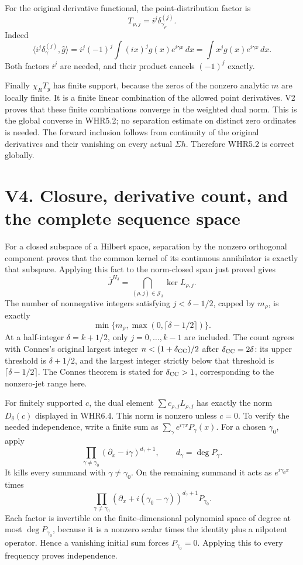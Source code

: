 For the original derivative functional, the point-distribution factor is
\[
T_{\rho,j}=i^j\delta_{\gamma_\rho}^{(j)}.
\] Indeed \[
\langle i^j\delta_{\gamma}^{(j)},\widehat g\rangle
=i^j(-1)^j\int (ix)^jg(x)e^{i\gamma x}\,dx
=\int x^jg(x)e^{i\gamma x}\,dx.
\] Both factors \(i^j\) are needed, and their product cancels \((-1)^j\)
exactly.

Finally \(\chi_RT_y\) has finite support, because the zeros of the
nonzero analytic \(m\) are locally finite. It is a finite linear
combination of the allowed point derivatives. V2 proves that these
finite combinations converge in the weighted dual norm. This is the
global converse in WHR5.2; no separation estimate on distinct zero
ordinates is needed. The forward inclusion follows from continuity of
the original derivatives and their vanishing on every actual
\(\Sigma h\). Therefore WHR5.2 is correct globally.

\section{V4. Closure, derivative count, and the complete sequence
space}\label{v4.-closure-derivative-count-and-the-complete-sequence-space}

For a closed subspace of a Hilbert space, separation by the nonzero
orthogonal component proves that the common kernel of its continuous
annihilator is exactly that subspace. Applying this fact to the
norm-closed span just proved gives \[
\overline J^{H_\delta}
=\bigcap_{(\rho,j)\in\mathscr J_\delta}\ker L_{\rho,j}.
\] The number of nonnegative integers satisfying \(j<\delta-1/2\),
capped by \(m_\rho\), is exactly \[
\min\{m_\rho,\max(0,\lceil\delta-1/2\rceil)\}.
\] At a half-integer \(\delta=k+1/2\), only \(j=0,\ldots,k-1\) are
included. The count agrees with Connes's original largest integer
\(n<(1+\delta_{\rm CC})/2\) after \(\delta_{\rm CC}=2\delta\): its upper
threshold is \(\delta+1/2\), and the largest integer strictly below that
threshold is \(\lceil\delta-1/2\rceil\). The Connes theorem is stated
for \(\delta_{\rm CC}>1\), corresponding to the nonzero-jet range here.

For finitely supported \(c\), the dual element
\(\sum c_{\rho,j}L_{\rho,j}\) has exactly the norm \(D_\delta(c)\)
displayed in WHR6.4. This norm is nonzero unless \(c=0\). To verify the
needed independence, write a finite sum as
\(\sum_\gamma e^{i\gamma x}P_\gamma(x)\). For a chosen \(\gamma_0\),
apply \[
\prod_{\gamma\ne\gamma_0}(\partial_x-i\gamma)^{d_\gamma+1},
\qquad d_\gamma=\deg P_\gamma.
\] It kills every summand with \(\gamma\ne\gamma_0\). On the remaining
summand it acts as \(e^{i\gamma_0x}\) times \[
\prod_{\gamma\ne\gamma_0}
(\partial_x+i(\gamma_0-\gamma))^{d_\gamma+1}P_{\gamma_0}.
\] Each factor is invertible on the finite-dimensional polynomial space
of degree at most \(\deg P_{\gamma_0}\), because it is a nonzero scalar
times the identity plus a nilpotent operator. Hence a vanishing initial
sum forces \(P_{\gamma_0}=0\). Applying this to every frequency proves
independence.

